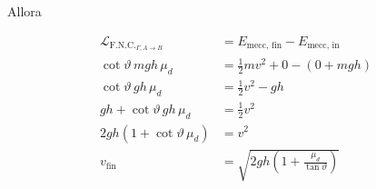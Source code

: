 Allora

\begin{align*}
	\mathcal{L}_{\text{F.N.C.}_{\Gamma, A \to B}} &= E_{\text{mecc, fin}} - E_{\text{mecc, in}} \\
	\cot\vartheta \,mgh\, \mu_d &= \frac{1}{2}mv^2 +0 - (0 + mgh) \\
	\cot\vartheta \,gh\, \mu_d &= \frac{1}{2}v^2 -gh \\
	gh + \cot\vartheta \,gh\, \mu_d &= \frac{1}{2}v^2 \\
	2gh (1 + \cot\vartheta \, \mu_d) &= v^2 \\
	v_{\text{fin}} &= \sqrt{2gh\left(1+\frac{\mu_d}{\tan\vartheta}\right)}
\end{align*}